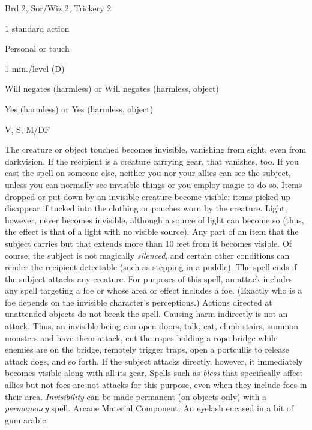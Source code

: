 
\begin{description*}
\item[Level:] Brd 2, Sor/Wiz 2, Trickery 2
\item[Casting Time:] 1 standard action
\item[Range:] Personal or touch
\item[Duration:] 1 min./level (D)
\item[Saving Throw:] Will negates (harmless) or Will negates (harmless, object)
\item[Spell Resistance:] Yes (harmless) or Yes (harmless, object)
\item[Components:] V, S, M/DF
\end{description*}

The creature or object touched becomes invisible, vanishing from sight, even from
darkvision. If the recipient is a creature carrying gear, that vanishes, too. If
you cast the spell on someone else, neither you nor your allies can see the subject,
unless you can normally see invisible things or you employ magic to do so.
Items dropped or put down by an invisible creature become visible; items picked
up disappear if tucked into the clothing or pouches worn by the creature. Light,
however, never becomes invisible, although a source of light can become so (thus,
the effect is that of a light with no visible source). Any part of an item that
the subject carries but that extends more than 10 feet from it becomes visible.
Of course, the subject is not magically \textit{silenced}, and certain other conditions
can render the recipient detectable (such as stepping in a puddle). The spell ends
if the subject attacks any creature. For purposes of this spell, an attack includes
any spell targeting a foe or whose area or effect includes a foe. (Exactly who
is a foe depends on the invisible character's perceptions.) Actions directed at
unattended objects do not break the spell. Causing harm indirectly is not an attack.
Thus, an invisible being can open doors, talk, eat, climb stairs, summon monsters
and have them attack, cut the ropes holding a rope bridge while enemies are on
the bridge, remotely trigger traps, open a portcullis to release attack dogs, and
so forth. If the subject attacks directly, however, it immediately becomes visible
along with all its gear. Spells such as \textit{bless} that specifically affect
allies but not foes are not attacks for this purpose, even when they include foes
in their area.
\textit{Invisibility} can be made permanent (on objects only) with a \textit{permanency
}spell.
Arcane Material Component: An eyelash encased in a bit of gum arabic.
